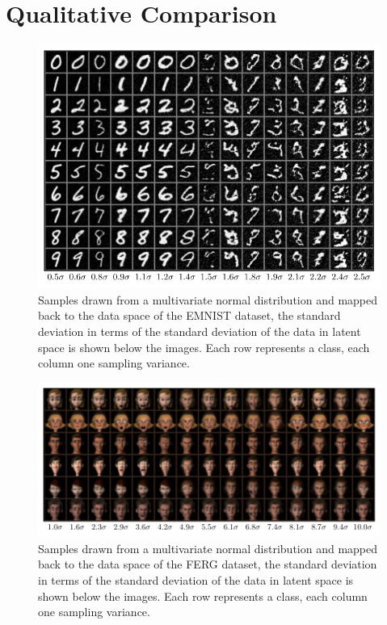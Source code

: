 \section{Qualitative Comparison}%
\label{sec:qualitative_comparison}

\begin{figure}[htpb]
	\centering
        \includegraphics{figures/samples/samples_increasing_distance_EMNIST.pdf}
	\caption{Samples drawn from a multivariate normal distribution and
		mapped back to the data space of the EMNIST dataset, the standard
		deviation in terms of the standard deviation of the data in latent
		space is shown below the images. Each row represents a class, each
		column one sampling variance.}%
	\label{fig:emnist_sample_sigma}
\end{figure}

\begin{figure}[htpb]
	\centering
        \includegraphics{figures/samples/samples_increasing_distance_FERG_people.pdf}
	\caption{Samples drawn from a multivariate normal distribution and
		mapped back to the data space of the FERG dataset, the standard
		deviation in terms of the standard deviation of the data in latent
		space is shown below the images. Each row represents a class, each
		column one sampling variance.}%
	\label{fig:ferg_sample_sigma}
\end{figure}

